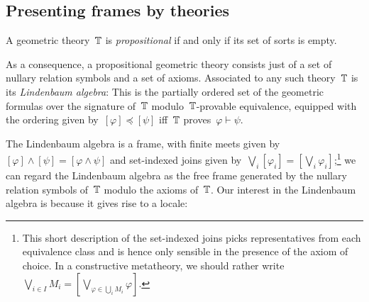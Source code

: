 \documentclass{ws-rv9x6}
\begin{document}
{\begin{table}[ht]
  \label{table:classifying-topos}
\end{table}


\subsection{Presenting frames by theories}
\label{sect:presenting-frames}

\begin{definition}A geometric theory~$\mathbb{T}$ is \emph{propositional} if and only
if its set of sorts is empty.\end{definition}

As a consequence, a propositional geometric theory consists just of a set of
nullary relation symbols and a set of axioms. Associated to any such
theory~$\mathbb{T}$ is its \emph{Lindenbaum algebra}: This is the partially ordered
set of the geometric formulas over the signature of~$\mathbb{T}$ modulo~$\mathbb{T}$-provable
equivalence, equipped with the ordering given by~$[\varphi] \preceq [\psi]$ iff~$\mathbb{T}$
proves~$\varphi \vdash \psi$.

The Lindenbaum algebra is a frame, with finite meets given by~$[\varphi] \wedge
[\psi] = [\varphi \wedge \psi]$ and set-indexed joins given by~$\bigvee_i
[\varphi_i] = [\bigvee_i \varphi_i]$;\footnote{This short description of the
set-indexed joins picks representatives from each equivalence class and is
hence only sensible in the presence of the axiom of choice. In a
constructive metatheory, we should rather write~$\bigvee_{i \in I} M_i =
[\bigvee_{\varphi \in \bigcup_i M_i} \varphi]$.}
we can regard the Lindenbaum algebra as the free
frame generated by the nullary relation symbols of~$\mathbb{T}$ modulo the axioms
of~$\mathbb{T}$. Our interest in the Lindenbaum algebra is because it gives rise to a
locale:

}
\end{document}
